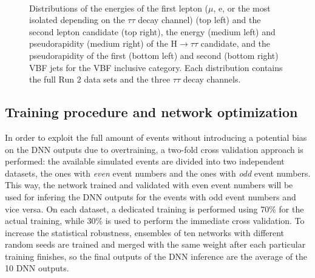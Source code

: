 \documentclass[../main.tex]{subfiles}
\begin{document}
\begin{figure}[h!]
\begin{center}
\\
\end{center}
\caption[Input variable distributions for the multi-class approach]{Distributions of the energies of the first lepton ($\mu$, e, or the most isolated \tauh{} depending on the $\tau\tau$ decay channel) (top left) and the second lepton candidate (top right), the energy (medium left) and pseudorapidity (medium right) of the H$\to\tau\tau$ candidate, and the pseudorapidity of the first (bottom left) and second (bottom right) VBF jets for the VBF inclusive category. Each distribution contains the full Run 2 data sets and the three $\tau\tau$ decay channels.}
\label{hh:fig:multiclass_input}
\end{figure}



\subsection{Training procedure and network optimization}
\label{subs:hh:multi_training}

In order to exploit the full amount of events without introducing a potential bias on the DNN outputs due to overtraining, a two-fold cross validation approach is performed: the available simulated events are divided into two independent datasets, the ones with \textit{even} event numbers and the ones with \textit{odd} event numbers. This way, the network trained and validated with even event numbers will be used for infering the DNN outputs for the events with odd event numbers and vice versa. On each dataset, a dedicated training is performed using 70\% for the actual training, while 30\% is used to perform the immediate cross validation. To increase the statistical robustness, ensembles of ten networks with different random seeds are trained and merged with the same weight after each particular training finishes, so the final outputs of the DNN inference are the average of the 10 DNN outputs.
\end{document}
